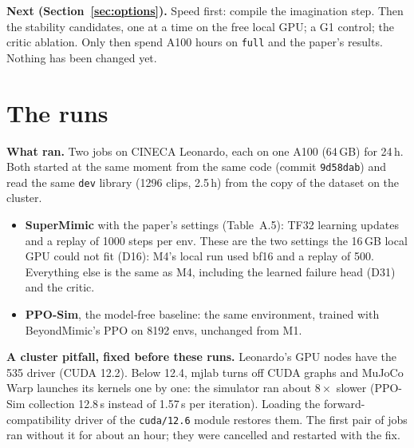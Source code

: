 \documentclass[10pt]{article}
\begin{document}
\textbf{Next (Section~\ref{sec:options}).} Speed first: compile the imagination step. Then the
stability candidates, one at a time on the free local GPU; a G1 control; the critic ablation. Only then
spend A100 hours on \texttt{full} and the paper's results. Nothing has been changed yet.

\section{The runs}

\textbf{What ran.} Two jobs on CINECA Leonardo, each on one A100 (64\,GB) for 24\,h. Both started at
the same moment from the same code (commit \texttt{9d58dab}) and read the same \texttt{dev} library
(1296 clips, 2.5\,h) from the copy of the dataset on the cluster.
\begin{itemize}
  \item \textbf{SuperMimic} with the paper's settings (Table~A.5): TF32 learning updates and a replay of
  1000 steps per env. These are the two settings the 16\,GB local GPU could not fit (D16): M4's local
  run used bf16 and a replay of 500. Everything else is the same as M4, including the learned failure
  head (D31) and the critic.
  \item \textbf{PPO-Sim}, the model-free baseline: the same environment, trained with BeyondMimic's PPO
  on 8192 envs, unchanged from M1.
\end{itemize}

\textbf{A cluster pitfall, fixed before these runs.} Leonardo's GPU nodes have the 535 driver (CUDA
12.2). Below 12.4, mjlab turns off CUDA graphs and MuJoCo Warp launches its kernels one by one: the
simulator ran about $8\times$ slower (PPO-Sim collection 12.8\,s instead of 1.57\,s per iteration).
Loading the forward-compatibility driver of the \texttt{cuda/12.6} module restores them. The first pair
of jobs ran without it for about an hour; they were cancelled and restarted with the fix.

\begin{table}[H]
\centering\small
\caption{Throughput. Simulator steps: 24 per env per PPO iteration on 8192 envs; about 2.5 per env per
SuperMimic iteration on 4096 envs.}
\label{tab:throughput}

\end{table}
\end{document}

